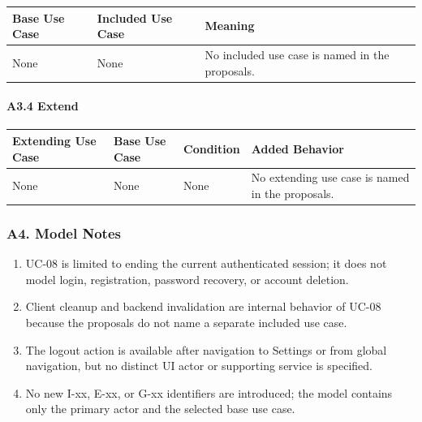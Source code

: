 \documentclass[12pt]{article}
\renewcommand{\baselinestretch}{1.5}
\begin{document}
\begingroup
\small
\renewcommand{\baselinestretch}{1.0}\selectfont
\renewcommand{\arraystretch}{1.15}
\setlength{\tabcolsep}{6pt}
\begin{longtable}{|>{\raggedright\arraybackslash}p{}|>{\raggedright\arraybackslash}p{}|>{\raggedright\arraybackslash}p{}|}
\hline
\textbf{Base Use Case} & \textbf{Included Use Case} & \textbf{Meaning} \\ \hline
\endhead
None & None & No included use case is named in the proposals. \\ \hline
\end{longtable}
\endgroup
\par\medskip

\hypertarget{sec:a3-4-extend}{}
\paragraph*{A3.4 Extend}
\par\medskip

\begingroup
\small
\renewcommand{\baselinestretch}{1.0}\selectfont
\renewcommand{\arraystretch}{1.15}
\setlength{\tabcolsep}{6pt}
\begin{longtable}{|>{\raggedright\arraybackslash}p{}|>{\raggedright\arraybackslash}p{}|>{\raggedright\arraybackslash}p{}|>{\raggedright\arraybackslash}p{}|}
\hline
\textbf{Extending Use Case} & \textbf{Base Use Case} & \textbf{Condition} & \textbf{Added Behavior} \\ \hline
\endhead
None & None & None & No extending use case is named in the proposals. \\ \hline
\end{longtable}
\endgroup
\par\medskip

\hypertarget{sec:a4-model-notes}{}
\subsubsection*{A4. Model Notes}
\par\medskip

\begin{enumerate}
\item UC-08 is limited to ending the current authenticated session; it does not model login, registration, password recovery, or account deletion.
\item Client cleanup and backend invalidation are internal behavior of UC-08 because the proposals do not name a separate included use case.
\item The logout action is available after navigation to Settings or from global navigation, but no distinct UI actor or supporting service is specified.
\item No new I-xx, E-xx, or G-xx identifiers are introduced; the model contains only the primary actor and the selected base use case.
\end{enumerate}
\par\medskip
\end{document}
